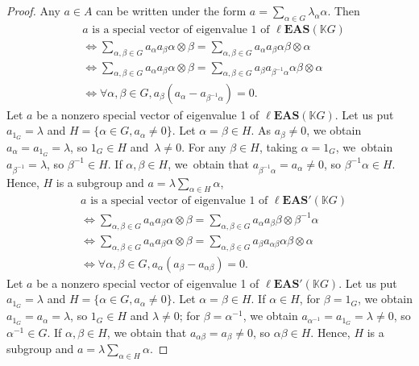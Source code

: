 \documentclass[10pt,a4paper]{amsart}
\numberwithin{equation}{section}
\newcommand{\leas}{\ell\mathbf{EAS}}
\begin{document}
\begin{proof}
Any $a\in A$ can be written under the form $ a=\sum_{\alpha \in G} \lambda_\alpha \alpha$. Then
\begin{align*}
&a\text{ is a special vector of eigenvalue 1 of }\leas(\mathbb{K} G)\\
&\Longleftrightarrow \sum_{\alpha,\beta \in G} a_\alpha a_\beta \alpha \otimes \beta=\sum_{\alpha,\beta\in G}a_\alpha a_\beta \alpha \beta \otimes \alpha\\
&\Longleftrightarrow\sum_{\alpha,\beta \in G} a_\alpha a_\beta \alpha \otimes \beta=\sum_{\alpha,\beta\in G}a_\beta a_{\beta^{-1}\alpha} \alpha \beta \otimes \alpha\\
&\Longleftrightarrow\forall \alpha,\beta \in G, a_\beta(a_\alpha-a_{\beta^{-1}\alpha})=0.
\end{align*}
Let $a$ be a nonzero special vector of eigenvalue 1 of $\leas(\mathbb{K} G)$. Let us put $a_{1_G}=\lambda$ and $H=\{\alpha \in G, a_\alpha \neq 0\}$. Let $\alpha=\beta \in H$.
As $a_\beta\neq 0$, we obtain $a_\alpha=a_{1_G}=\lambda$, so $1_G\in H$ and~${\lambda \neq 0}$. For any $\beta \in H$, taking $\alpha=1_G$, we~obtain $a_{\beta^{-1}}=\lambda$, so $\beta^{-1}\in H$.
If $\alpha,\beta \in H$, we~obtain that $a_{\beta^{-1}\alpha}=a_\alpha\neq 0$, so $\beta^{-1}\alpha \in H$. Hence, $H$ is a subgroup and $ a=\lambda \sum_{\alpha \in H}\alpha$,
\begin{align*}
&a\text{ is a special vector of eigenvalue 1 of }\leas'(\mathbb{K} G)\\
&\Longleftrightarrow \sum_{\alpha,\beta \in G} a_\alpha a_\beta \alpha \otimes \beta=\sum_{\alpha,\beta\in G}a_\alpha a_\beta \beta \otimes \beta^{-1}\alpha\\
&\Longleftrightarrow\sum_{\alpha,\beta \in G} a_\alpha a_\beta \alpha \otimes \beta=\sum_{\alpha,\beta\in G}a_\beta a_{\alpha\beta} \alpha \beta \otimes \alpha\\
&\Longleftrightarrow\forall \alpha,\beta \in G, a_\alpha(a_\beta-a_{\alpha\beta})=0.
\end{align*}
Let $a$ be a nonzero special vector of eigenvalue 1 of $\leas'(\mathbb{K} G)$. Let us put $a_{1_G}=\lambda$ and $H=\{\alpha \in G, a_\alpha \neq 0\}$. Let $\alpha=\beta \in H$.
If $\alpha \in H$, for $\beta=1_G$, we obtain $a_{1_G}=a_\alpha=\lambda$, so $1_G\in H$ and $\lambda \neq 0$; for $\beta=\alpha^{-1}$, we obtain $a_{\alpha^{-1}}=a_{1_G}=\lambda\neq 0$, so $\alpha^{-1}\in G$.
If $\alpha,\beta \in H$, we obtain that $a_{\alpha\beta}=a_\beta\neq 0$, so $\alpha \beta\in H$. Hence, $H$ is a subgroup and $ a=\lambda \sum_{\alpha \in H}\alpha$.


\end{proof}
\end{document}
